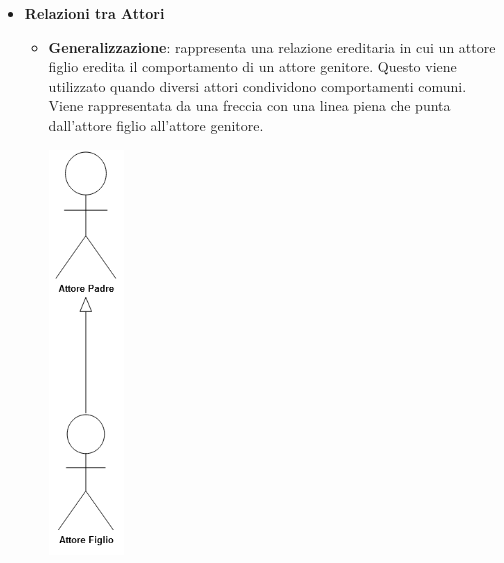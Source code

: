 \begin{itemize}
	\item \textbf{Relazioni tra Attori}
		\begin{itemize}
			\item \textbf{Generalizzazione}: rappresenta una relazione ereditaria in cui un attore figlio eredita il comportamento di un attore genitore. Questo viene utilizzato quando diversi attori condividono comportamenti comuni. Viene rappresentata da una freccia con una linea piena che punta dall'attore figlio all'attore genitore.
				\begin{center}
					\includegraphics*[width=2cm]{../../../images/norme_di_progetto/generalizzazioneTraAttori.png}
				\end{center}
		\end{itemize}
	\newpage
	

\end{itemize}
